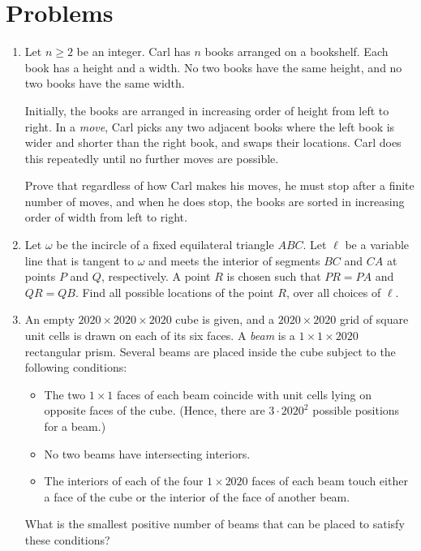 \documentclass[11pt]{scrartcl}
\begin{document}
\section{Problems}
\begin{enumerate}[\bfseries 1.]
\item %
Let $n \ge 2$ be an integer.
Carl has $n$ books arranged on a bookshelf.
Each book has a height and a width.
No two books have the same height,
and no two books have the same width.

Initially, the books are arranged in
increasing order of height from left to right.
In a \emph{move}, Carl picks any two adjacent books
where the left book is wider and shorter than the right book,
and swaps their locations.
Carl does this repeatedly until no further moves are possible.

Prove that regardless of how Carl makes his moves,
he must stop after a finite number of moves, and when he does stop,
the books are sorted in increasing order of width from left to right.

\item %
Let $\omega$ be the incircle of a
fixed equilateral triangle $ABC$.
Let $\ell$ be a variable line that is tangent to $\omega$
and meets the interior of segments $BC$ and $CA$
at points $P$ and $Q$, respectively.
A point $R$ is chosen such that $PR=PA$ and $QR=QB$.
Find all possible locations of the point $R$,
over all choices of $\ell$.

\item %
An empty $2020 \times 2020 \times 2020$ cube is given,
and a $2020 \times 2020$ grid of square unit cells is drawn on each of its six faces.
A \emph{beam} is a $1 \times 1 \times 2020$ rectangular prism.
Several beams are placed inside the cube subject to the following conditions:
\begin{itemize}
\item The two $1 \times 1$ faces of each beam coincide
  with unit cells lying on opposite faces of the cube.
  (Hence, there are $3 \cdot 2020^2$ possible positions for a beam.)
\item No two beams have intersecting interiors.
\item The interiors of each of the four $1 \times 2020$ faces of each beam touch
  either a face of the cube or the interior of the face of another beam.
\end{itemize}
What is the smallest positive number of beams that can be placed to satisfy these conditions?


\end{enumerate}
\end{document}
